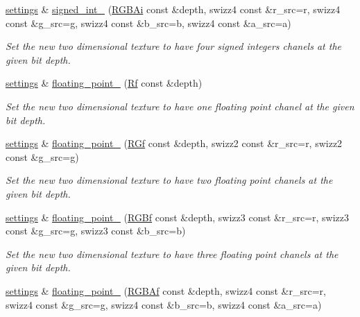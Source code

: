 \begin{DoxyCompactItemize}
\hyperlink{classgfx_1_1texture__2D_1_1settings}{settings} \& \hyperlink{classgfx_1_1texture__2D_1_1settings_a6ed933754d9fe21de85803b24d20bd0f}{signed\-\_\-int\-\_} (\hyperlink{classgfx_1_1RGBAi}{R\-G\-B\-Ai} const \&depth, swizz4 const \&r\-\_\-src=r, swizz4 const \&g\-\_\-src=g, swizz4 const \&b\-\_\-src=b, swizz4 const \&a\-\_\-src=a)
\begin{DoxyCompactList}\small\item\em Set the new two dimensional texture to have four signed integers chanels at the given bit depth. \end{DoxyCompactList}\item 
\hyperlink{classgfx_1_1texture__2D_1_1settings}{settings} \& \hyperlink{classgfx_1_1texture__2D_1_1settings_ac87fd8f9d262d3f03454609bacd25dd7}{floating\-\_\-point\-\_} (\hyperlink{classgfx_1_1Rf}{Rf} const \&depth)
\begin{DoxyCompactList}\small\item\em Set the new two dimensional texture to have one floating point chanel at the given bit depth. \end{DoxyCompactList}\item 
\hyperlink{classgfx_1_1texture__2D_1_1settings}{settings} \& \hyperlink{classgfx_1_1texture__2D_1_1settings_a8e61483d77c9eeb2d11d18d508d878bc}{floating\-\_\-point\-\_} (\hyperlink{classgfx_1_1RGf}{R\-Gf} const \&depth, swizz2 const \&r\-\_\-src=r, swizz2 const \&g\-\_\-src=g)
\begin{DoxyCompactList}\small\item\em Set the new two dimensional texture to have two floating point chanels at the given bit depth. \end{DoxyCompactList}\item 
\hyperlink{classgfx_1_1texture__2D_1_1settings}{settings} \& \hyperlink{classgfx_1_1texture__2D_1_1settings_a90264b695e7970f2f202e0f63f77aae5}{floating\-\_\-point\-\_} (\hyperlink{classgfx_1_1RGBf}{R\-G\-Bf} const \&depth, swizz3 const \&r\-\_\-src=r, swizz3 const \&g\-\_\-src=g, swizz3 const \&b\-\_\-src=b)
\begin{DoxyCompactList}\small\item\em Set the new two dimensional texture to have three floating point chanels at the given bit depth. \end{DoxyCompactList}\item 
\hyperlink{classgfx_1_1texture__2D_1_1settings}{settings} \& \hyperlink{classgfx_1_1texture__2D_1_1settings_ad7f0d82cca8536d8e3901254ba8c4b92}{floating\-\_\-point\-\_} (\hyperlink{classgfx_1_1RGBAf}{R\-G\-B\-Af} const \&depth, swizz4 const \&r\-\_\-src=r, swizz4 const \&g\-\_\-src=g, swizz4 const \&b\-\_\-src=b, swizz4 const \&a\-\_\-src=a)

\end{DoxyCompactItemize}
